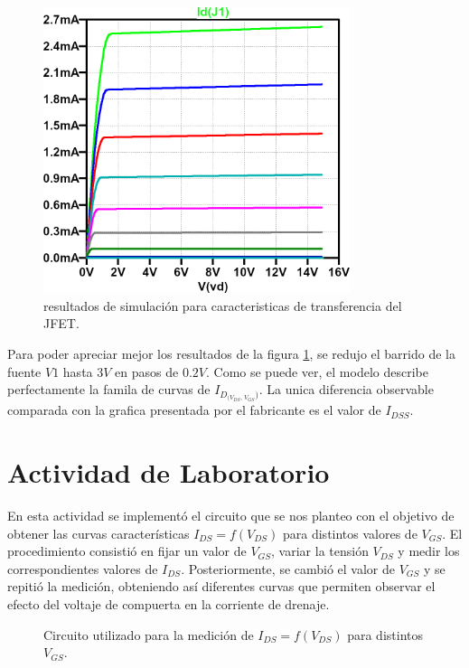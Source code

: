     \begin{figure}[!ht]
      \centering
      \includegraphics[width=0.8\textwidth]{images/transferencia-id_vds-vgs.png}
      \caption{resultados de simulación para caracteristicas de transferencia del JFET.}
      \label{fig:sim.transf}
    \end{figure}

    Para poder apreciar mejor los resultados de la figura \ref{fig:sim.transf}, se redujo el barrido de la fuente $V1$
    hasta $3V$ en pasos de $0.2V$. Como se puede ver, el modelo describe perfectamente la famila de curvas de
    $I_{D_{(V_{DS}, \, V_{GS}})}$. La unica diferencia observable comparada con la grafica presentada por el fabricante es el
    valor de $I_{DSS}$.

\section{Actividad de Laboratorio}

    En esta actividad se implementó el circuito que se nos planteo con el objetivo de obtener las curvas características $I_{DS} = f(V_{DS})$ para distintos valores de $V_{GS}$.  
    El procedimiento consistió en fijar un valor de $V_{GS}$, variar la tensión $V_{DS}$ y medir 
    los correspondientes valores de $I_{DS}$. Posteriormente, se cambió el valor de $V_{GS}$ y 
    se repitió la medición, obteniendo así diferentes curvas que permiten observar el efecto 
    del voltaje de compuerta en la corriente de drenaje.  
    
    \begin{figure}[H]
    \centering

    \caption{Circuito utilizado para la medición de $I_{DS} = f(V_{DS})$ para distintos $V_{GS}$.}
    \label{crkt:jfet-carac}
    \end{figure}
    
